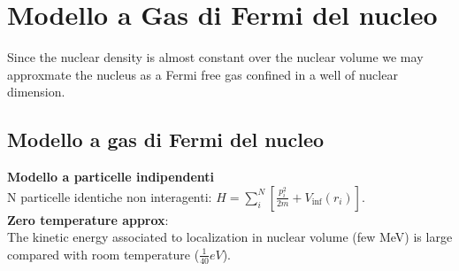 \section{Modello a Gas di Fermi del nucleo}

Since the nuclear density is almost constant over the nuclear volume we may approxmate the nucleus as a Fermi free gas confined in a well of nuclear dimension.

\subsection{Modello a gas di Fermi del  nucleo}
\textbf{Modello a particelle indipendenti}\\
N particelle identiche non interagenti: $H=\sum_i^N [ \frac{p_i^2}{2m}+V_{\inf}(r_i)]$.\\
\textbf{Zero temperature approx}:\\
The kinetic energy associated to localization in nuclear volume (few MeV) is large compared with room temperature ($\frac{1}{40} eV$).

